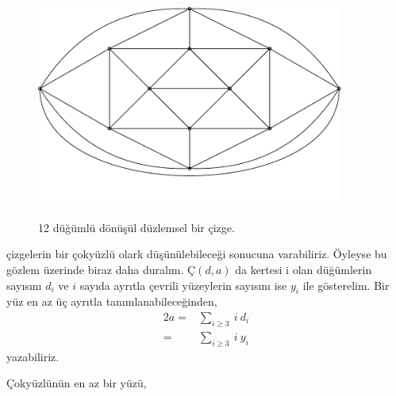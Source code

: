 \documentclass[11pt]{amsbook}
\begin{document}

 \begin{figure}[h]
 \centering
\includegraphics[width=0.90\textwidth]{images/cyhn180fig01.pdf} 
\label{fig:cyhn-180-fig01}
\caption{12 düğümlü dönüşül düzlemsel bir çizge.}
\end{figure}

çizgelerin bir çokyüzlü olark düşünülebileceği sonucuna varabiliriz. Öyleyse bu gözlem üzerinde biraz daha duralım. $Ç(d,a)$ da kertesi i olan düğümlerin sayısını $d_i$ ve $i$ sayıda ayrıtla çevrili yüzeylerin sayısını ise $y_i$ ile gösterelim. Bir yüz en az üç ayrıtla tanımlanabileceğinden, 
\begin{align*}
 2a =& \sum_{i \geq 3} \: i \: d_{i} \\
    =& \sum_{i \geq 3} \: i \: y_{i}
\end{align*}
yazabiliriz.
\begin{theorem}
Çokyüzlünün en az bir yüzü, 
\end{theorem} 
\end{document}
